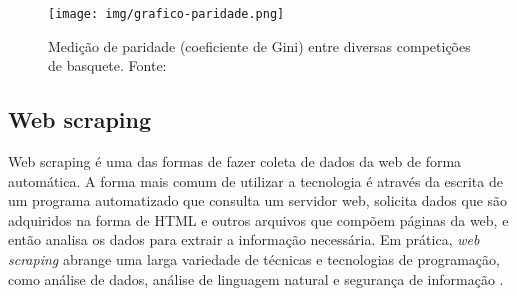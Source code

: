 \documentclass[brazilian]{ifsc-tcc}
\begin{document}
\begin{figure} [h]
    \centering
    \texttt{[image: img/grafico-paridade.png]}
    \caption{Medição de paridade (coeficiente de Gini) entre diversas competições de basquete. Fonte: \cite{paridade-basquete-harvard}}
    \label{fig:grafico-paridade}
\end{figure}












\subsection{Web scraping}
Web scraping é uma das formas de fazer coleta de dados da web de forma automática. A forma mais comum de utilizar a tecnologia é através da escrita de um programa automatizado que consulta um servidor web, solicita dados que são adquiridos na forma de HTML e outros arquivos que compõem páginas da web, e então analisa os dados para extrair a informação necessária. Em prática, \textit{web scraping} abrange uma larga variedade de técnicas e tecnologias de programação, como análise de dados, análise de linguagem natural e segurança de informação \cite{livro-web-scraping}.
\end{document}
